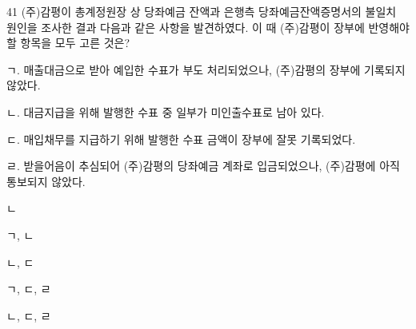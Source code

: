 \begin{question}{41}
(주)감평이 총계정원장 상 당좌예금 잔액과 은행측 당좌예금잔액증명서의 불일치 원인을 조사한 결과 다음과 같은 사항을 발견하였다. 이 때 (주)감평이 장부에 반영해야 할 항목을 모두 고른 것은?
\begin{framedtext}
ㄱ. 매출대금으로 받아 예입한 수표가 부도 처리되었으나, (주)감평의 장부에 기록되지 않았다. \par
ㄴ. 대금지급을 위해 발행한 수표 중 일부가 미인출수표로 남아 있다. \par
ㄷ. 매입채무를 지급하기 위해 발행한 수표 금액이 장부에 잘못 기록되었다. \par
ㄹ. 받을어음이 추심되어 (주)감평의 당좌예금 계좌로 입금되었으나, (주)감평에 아직 통보되지 않았다. \par
\end{framedtext}
\begin{choices}
  \item ㄴ
  \item ㄱ, ㄴ
  \item ㄴ, ㄷ
  \item ㄱ, ㄷ, ㄹ
  \item ㄴ, ㄷ, ㄹ
\end{choices}
\end{question}
